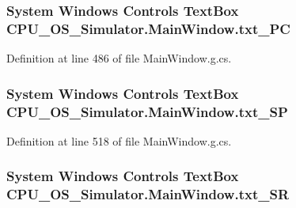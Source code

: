 \subsubsection[{txt\+\_\+\+P\+C}]{\setlength{\rightskip}{0pt plus 5cm}System Windows Controls Text\+Box C\+P\+U\+\_\+\+O\+S\+\_\+\+Simulator.\+Main\+Window.\+txt\+\_\+\+P\+C\hspace{0.3cm}{\ttfamily [package]}}\label{class_c_p_u___o_s___simulator_1_1_main_window_a7100765f8e26fa4c97a76dd445942b97}


Definition at line 486 of file Main\+Window.\+g.\+cs.

\hypertarget{class_c_p_u___o_s___simulator_1_1_main_window_ac2427655774b9ca2b4c368651d5cd9de}{}
\subsubsection[{txt\+\_\+\+S\+P}]{\setlength{\rightskip}{0pt plus 5cm}System Windows Controls Text\+Box C\+P\+U\+\_\+\+O\+S\+\_\+\+Simulator.\+Main\+Window.\+txt\+\_\+\+S\+P\hspace{0.3cm}{\ttfamily [package]}}\label{class_c_p_u___o_s___simulator_1_1_main_window_ac2427655774b9ca2b4c368651d5cd9de}


Definition at line 518 of file Main\+Window.\+g.\+cs.

\hypertarget{class_c_p_u___o_s___simulator_1_1_main_window_a9135c01bacd48e517d7cf46f69ea87d2}{}
\subsubsection[{txt\+\_\+\+S\+R}]{\setlength{\rightskip}{0pt plus 5cm}System Windows Controls Text\+Box C\+P\+U\+\_\+\+O\+S\+\_\+\+Simulator.\+Main\+Window.\+txt\+\_\+\+S\+R\hspace{0.3cm}{\ttfamily [package]}}\label{class_c_p_u___o_s___simulator_1_1_main_window_a9135c01bacd48e517d7cf46f69ea87d2}


